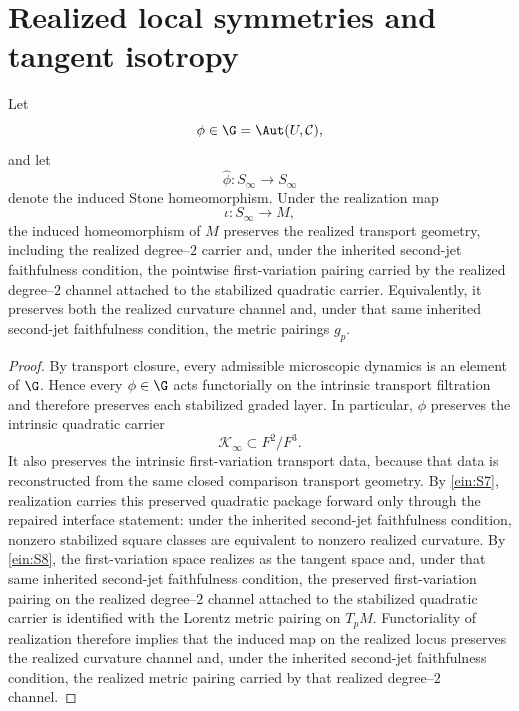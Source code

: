 \section{Realized local symmetries and tangent isotropy}
\label{sec:einstein-rigidity}
\begin{lemma}
	\label{lem:einstein-realized-preservation}
	Let
	\[
		\phi\in\G=\Aut(U,\mathcal C),
	\]
	and let
	\[
		\widehat\phi:S_\infty\to S_\infty
	\]
	denote the induced Stone homeomorphism.
	Under the realization map
	\[
		\iota:S_\infty\to M,
	\]
	the induced homeomorphism of \(M\) preserves the realized transport
	geometry, including the realized degree--\(2\) carrier and, under the
	inherited second-jet faithfulness condition, the pointwise
	first-variation pairing carried by the realized degree--\(2\)
	channel attached to the stabilized quadratic carrier.
	Equivalently, it preserves both the realized curvature channel and,
	under that same inherited second-jet faithfulness condition, the metric
	pairings \(g_p\).
\end{lemma}
\begin{proof}
	By transport closure, every admissible microscopic dynamics is an
	element of \(\G\).
	Hence every \(\phi\in\G\) acts functorially on the intrinsic transport
	filtration and therefore preserves each stabilized graded layer.
	In particular, \(\phi\) preserves the intrinsic quadratic carrier
	\[
		\mathcal K_\infty\subset F^2/F^3.
	\]
	It also preserves the intrinsic first-variation transport data, because
	that data is reconstructed from the same closed comparison transport
	geometry.
	By \ref{ein:S7}, realization carries this preserved quadratic package
	forward only through the repaired interface statement: under the
	inherited second-jet faithfulness condition, nonzero stabilized square
	classes are equivalent to nonzero realized curvature.
	By \ref{ein:S8}, the first-variation space realizes as the tangent
	space and, under that same inherited second-jet faithfulness condition,
	the preserved first-variation pairing on the realized degree--\(2\)
	channel attached to the stabilized quadratic carrier is identified
	with the Lorentz metric pairing on \(T_pM\).
	Functoriality of realization therefore implies that the induced map on
	the realized locus preserves the realized curvature channel and, under
	the inherited second-jet faithfulness condition, the realized metric
	pairing carried by that realized degree--\(2\) channel.
\end{proof}
